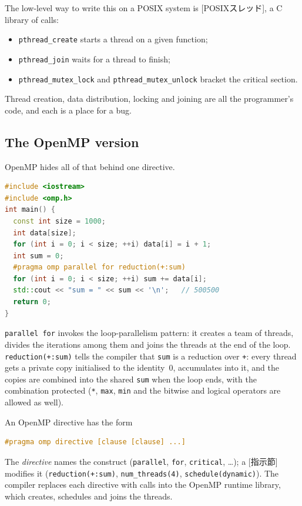 \documentclass[../main.tex]{subfiles}
\begin{document}
The low-level way to write this on a POSIX system is
[POSIXスレッド], a C library of
calls:
\begin{itemize}
  \item \texttt{pthread\_create} starts a thread on a given function;
  \item \texttt{pthread\_join} waits for a thread to finish;
  \item \texttt{pthread\_mutex\_lock} and \texttt{pthread\_mutex\_unlock}
    bracket the critical section.
\end{itemize}
Thread creation, data distribution, locking and joining are all the
programmer's code, and each is a place for a bug.

\subsection{The OpenMP version}

OpenMP hides all of that behind one directive.
\begin{lstlisting}[language=C++, numbers=none]
#include <iostream>
#include <omp.h>
int main() {
  const int size = 1000;
  int data[size];
  for (int i = 0; i < size; ++i) data[i] = i + 1;
  int sum = 0;
  #pragma omp parallel for reduction(+:sum)
  for (int i = 0; i < size; ++i) sum += data[i];
  std::cout << "sum = " << sum << '\n';   // 500500
  return 0;
}
\end{lstlisting}
\texttt{parallel for} invokes the loop-parallelism pattern: it creates a
team of threads, divides the iterations among them and joins the threads at
the end of the loop.  \texttt{reduction(+:sum)} tells the compiler that \texttt{sum} is a
reduction over \texttt{+}: every thread gets a private copy initialised to
the identity~0, accumulates into it, and the copies are combined into the
shared \texttt{sum} when the loop ends, with the combination protected
(\texttt{*}, \texttt{max}, \texttt{min} and the bitwise and logical
operators are allowed as well).

\begin{definition}
  An OpenMP directive has the form
\begin{lstlisting}[language=C++, numbers=none]
#pragma omp directive [clause [clause] ...]
\end{lstlisting}
  The \textit{directive} names the construct (\texttt{parallel},
  \texttt{for}, \texttt{critical}, \ldots); a [指示節]
  modifies it (\texttt{reduction(+:sum)}, \texttt{num\_threads(4)},
  \texttt{schedule(dynamic)}).  The compiler replaces each directive with
  calls into the OpenMP runtime library, which creates, schedules and joins
  the threads.
\end{definition}
\end{document}
